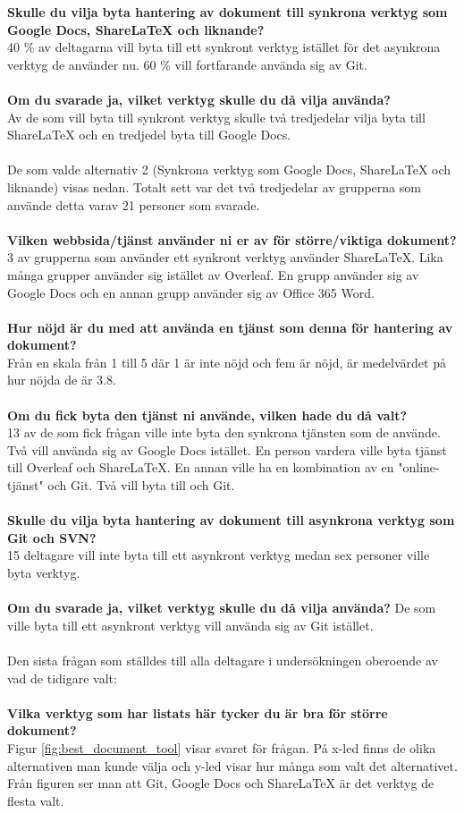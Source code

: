 \textbf{Skulle du vilja byta hantering av dokument till synkrona verktyg som Google Docs, ShareLaTeX och liknande?}\\
40 \% av deltagarna vill byta till ett synkront verktyg istället för det asynkrona verktyg de använder nu. 60 \% vill fortfarande använda sig av Git.\\\\
\textbf{Om du svarade ja, vilket verktyg skulle du då vilja använda?}\\
Av de som vill byta till synkront verktyg skulle två tredjedelar vilja byta till ShareLaTeX och en tredjedel byta till Google Docs.\\\\
De som valde alternativ 2 (Synkrona verktyg som Google Docs, ShareLaTeX och liknande) visas nedan. Totalt sett var det två tredjedelar av grupperna som använde detta varav 21 personer som svarade.\\\\
\textbf{Vilken webbsida/tjänst använder ni er av för större/viktiga dokument?}\\
3 av grupperna som använder ett synkront verktyg använder ShareLaTeX. Lika många grupper använder sig istället av Overleaf. En grupp använder sig av Google Docs och en annan grupp använder sig av Office 365 Word.\\\\
\textbf{Hur nöjd är du med att använda en tjänst som denna för hantering av dokument?}\\
Från en skala från 1 till 5 där 1 är inte nöjd och fem är nöjd, är medelvärdet på hur nöjda de är 3.8.\\\\
\textbf{Om du fick byta den tjänst ni använde, vilken hade du då valt?}\\ 
13 av de som fick frågan ville inte byta den synkrona tjänsten som de använde. Två vill använda sig av Google Docs istället. En person vardera ville byta tjänst till Overleaf och ShareLaTeX. En annan ville ha en kombination av en "online-tjänst" och Git. Två vill byta till \latex och Git.\\\\
\textbf{Skulle du vilja byta hantering av dokument till asynkrona verktyg som Git och SVN?}\\
15 deltagare vill inte byta till ett asynkront verktyg medan sex personer ville byta verktyg.\\\\
\textbf{Om du svarade ja, vilket verktyg skulle du då vilja använda?}
De som ville byta till ett asynkront verktyg vill använda sig av Git istället.\\\\
Den sista frågan som ställdes till alla deltagare i undersökningen oberoende av vad de tidigare valt:\\\\
\textbf{Vilka verktyg som har listats här tycker du är bra för större dokument?}\\
Figur \ref{fig:best_document_tool} visar svaret för frågan. På x-led finns de olika alternativen man kunde välja och y-led visar hur många som valt det alternativet. Från figuren ser man att Git, Google Docs och ShareLaTeX är det verktyg de flesta valt.

